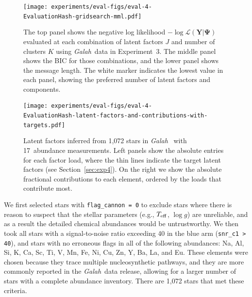 \documentclass[twocolumn]{aastex62}
\newcommand\teff{T_{\rm eff}}
\newcommand\logg{\log{g}}
\newcommand{\project}[1]{\textsl{#1}}
\newcommand{\Galah}{\project{Galah}}
\newcommand{\vect}[1]{\boldsymbol{\mathbf{#1}}}
\renewcommand{\vec}[1]{\vect{#1}}
\newcommand{\data}{\textbf{Y}}
\newcommand{\NumLatentFactors}{J}
\newcommand{\NumComponents}{K}
\newcommand{\ExperimentHash}{89dab}
\newcommand{\EvaluationHash}{c7d68}
\newcommand{\ExpThreeNumAbundances}{17}
\begin{document}
\begin{figure}

	\texttt{[image: experiments/eval-figs/eval-4-\\EvaluationHash-gridsearch-mml.pdf]}
    \caption{The top panel shows the negative log likelihood 
			 $-\log{\mathcal{L}\left(\data|\vec\Psi\right)}$ 
			 evaluated at each combination of latent factors 
			 $\NumLatentFactors$ and number of clusters 
			 $\NumComponents$ using \Galah\ data in
			 Experiment~3.  The middle panel shows 
			 the BIC for those combinations, and the lower panel shows the 
			 message length. The white marker indicates the
			 lowest value in each panel, showing the
			 preferred number of latent factors and components.}
    \label{fig:exp3-gridsearch}
\end{figure}

\begin{figure}
	\texttt{[image: experiments/eval-figs/eval-4-\\EvaluationHash-latent-factors-and-contributions-with-targets.pdf]}
	\caption{Latent factors inferred from 1,072 stars in \Galah\
			 \citep[][thick lines]{Buder:2018} with \ExpThreeNumAbundances\ abundance measurements. Left panels show the absolute entries for each
			 factor load, where the thin lines indicate the target latent factors (see Section~\ref{sec:exp4}). On the right we show the absolute fractional contributions
			 to each element, ordered by the loads that contribute most.}
    \label{fig:exp3-factor-loads}
\end{figure}



We first selected stars with \texttt{flag\_cannon = 0} to exclude
stars where there is reason to suspect that the stellar parameters
(e.g., $\teff$, $\logg$) are unreliable, and as a result the 
detailed chemical abundances would be untrustworthy. We then took all
stars with a signal-to-noise ratio exceeding 40 in the blue arm (\texttt{snr\_c1 > 40}), and
stars with no erroneous flags in all of the following abundances: Na, Al, Si, K, Ca, Sc, Ti, V, Mn, Fe, Ni, Cu, Zn, Y, Ba, La, and Eu.
These elements were chosen because they trace multiple nucleosynthetic pathways, and they are more commonly reported in the \Galah\ data release, allowing for a larger number of stars with a complete abundance inventory.
There are 1,072 stars that met these criteria. 
\end{document}
